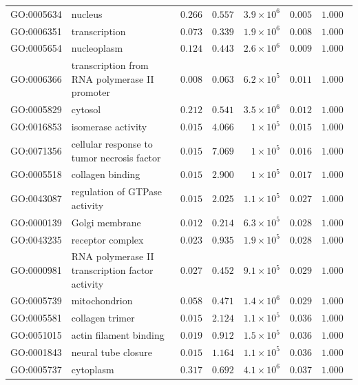 \documentclass{article}
\begin{document}
\begin{center}
\begin{longtable*}{|l|l|r|r|r|r|r|}
            GO:0005634 & nucleus & $ 0.266$ & $ 0.557$ & $3.9\times 10^{6}$ & $ 0.005$ & $ 1.000~~$ \\
            GO:0006351 & transcription & $ 0.073$ & $ 0.339$ & $1.9\times 10^{6}$ & $ 0.008$ & $ 1.000~~$ \\
            GO:0005654 & nucleoplasm & $ 0.124$ & $ 0.443$ & $2.6\times 10^{6}$ & $ 0.009$ & $ 1.000~~$ \\
            GO:0006366 & transcription from RNA polymerase II promoter & $ 0.008$ & $ 0.063$ & $6.2\times 10^{5}$ & $ 0.011$ & $ 1.000~~$ \\
            GO:0005829 & cytosol & $ 0.212$ & $ 0.541$ & $3.5\times 10^{6}$ & $ 0.012$ & $ 1.000~~$ \\
            GO:0016853 & isomerase activity & $ 0.015$ & $ 4.066$ & $ 1\times 10^{5}$ & $ 0.015$ & $ 1.000~~$ \\
            GO:0071356 & cellular response to tumor necrosis factor & $ 0.015$ & $ 7.069$ & $ 1\times 10^{5}$ & $ 0.016$ & $ 1.000~~$ \\
            GO:0005518 & collagen binding & $ 0.015$ & $ 2.900$ & $ 1\times 10^{5}$ & $ 0.017$ & $ 1.000~~$ \\
            GO:0043087 & regulation of GTPase activity & $ 0.015$ & $ 2.025$ & $1.1\times 10^{5}$ & $ 0.027$ & $ 1.000~~$ \\
            GO:0000139 & Golgi membrane & $ 0.012$ & $ 0.214$ & $6.3\times 10^{5}$ & $ 0.028$ & $ 1.000~~$ \\
            GO:0043235 & receptor complex & $ 0.023$ & $ 0.935$ & $1.9\times 10^{5}$ & $ 0.028$ & $ 1.000~~$ \\
            GO:0000981 & RNA polymerase II transcription factor activity & $ 0.027$ & $ 0.452$ & $9.1\times 10^{5}$ & $ 0.029$ & $ 1.000~~$ \\
            GO:0005739 & mitochondrion & $ 0.058$ & $ 0.471$ & $1.4\times 10^{6}$ & $ 0.029$ & $ 1.000~~$ \\
            GO:0005581 & collagen trimer & $ 0.015$ & $ 2.124$ & $1.1\times 10^{5}$ & $ 0.036$ & $ 1.000~~$ \\
            GO:0051015 & actin filament binding & $ 0.019$ & $ 0.912$ & $1.5\times 10^{5}$ & $ 0.036$ & $ 1.000~~$ \\
            GO:0001843 & neural tube closure & $ 0.015$ & $ 1.164$ & $1.1\times 10^{5}$ & $ 0.036$ & $ 1.000~~$ \\
            GO:0005737 & cytoplasm & $ 0.317$ & $ 0.692$ & $4.1\times 10^{6}$ & $ 0.037$ & $ 1.000~~$ \\

\end{longtable*}
\end{center}
\end{document}
